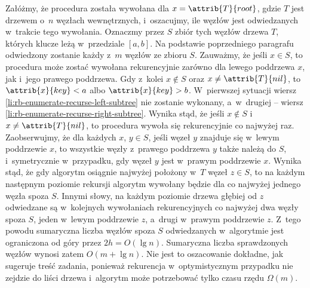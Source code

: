 Załóżmy, że procedura  została wywołana dla $x=\attrib{T}{root}$, gdzie $T$ jest drzewem o~$n$ węzłach wewnętrznych, i~oszacujmy, ile węzłów jest odwiedzanych w~trakcie tego wywołania.
Oznaczmy przez $S$ zbiór tych węzłów drzewa $T$, których klucze leżą w~przedziale $[a,b]$.
Na podstawie poprzedniego paragrafu odwiedzony zostanie każdy z~$m$ węzłów ze zbioru $S$.
Zauważmy, że jeśli $x\in S$, to procedura może zostać wywołana rekurencyjnie zarówno dla lewego poddrzewa $x$, jak i~jego prawego poddrzewa.
Gdy z~kolei $x\not\in S$ oraz $x\ne\attrib{T}{nil}$, to $\attrib{x}{key}<a$ albo $\attrib{x}{key}>b$.
W~pierwszej sytuacji wiersz \ref{li:rb-enumerate-recurse-left-subtree} nie zostanie wykonany, a~w~drugiej -- wiersz \ref{li:rb-enumerate-recurse-right-subtree}.
Wynika stąd, że jeśli $x\not\in S$ i~$x\ne\attrib{T}{nil}$, to procedura wywoła się rekurencyjnie co najwyżej raz.
Zaobserwujmy, że dla każdych $x$, $y\in S$, jeśli węzeł $y$ znajduje się w~lewym poddrzewie $x$, to wszystkie węzły z~prawego poddrzewa $y$ także należą do $S$, i~symetrycznie w~przypadku, gdy węzeł $y$ jest w~prawym poddrzewie $x$.
Wynika stąd, że gdy algorytm osiągnie najwyżej położony w~$T$ węzeł $z\in S$, to na każdym następnym poziomie rekursji algorytm wywołany będzie dla co najwyżej jednego węzła spoza $S$.
Innymi słowy, na każdym poziomie drzewa głębiej od $z$ odwiedzane są w~kolejnych wywołaniach rekurencyjnych co najwyżej dwa węzły spoza $S$, jeden w~lewym poddrzewie $z$, a~drugi w~prawym poddrzewie $z$.
Z~tego powodu sumaryczna liczba węzłów spoza $S$ odwiedzanych w~algorytmie jest ograniczona od góry przez $2h=O(\lg n)$.
Sumaryczna liczba sprawdzonych węzłów wynosi zatem $O(m+\lg n)$.
Nie jest to oszacowanie dokładne, jak sugeruje treść zadania, ponieważ rekurencja w~optymistycznym przypadku nie zejdzie do liści drzewa i~algorytm może potrzebować tylko czasu rzędu $\Omega(m)$.
